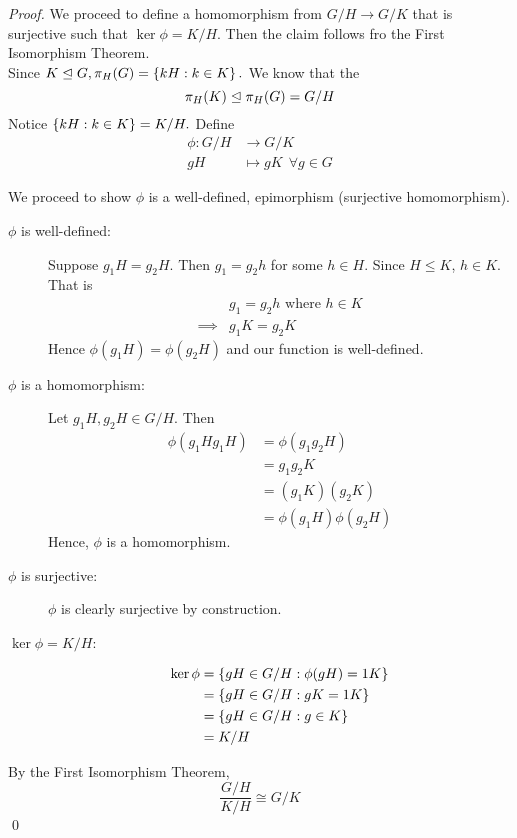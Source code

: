\begin{proof}
    We proceed to define a homomorphism from $G/H \to G/K$ that is surjective such that $\ker\phi = K/H$. Then the claim follows fro the First Isomorphism Theorem. \\

    Since $K\trianglelefteq G, \pi_H(G) = \left\{kH : k \in K\right\}.$ We know that the 
    $$\pi_H(K) \trianglelefteq \pi_H(G) = G/H$$
    Notice $\left\{kH : k \in K\right\} = K/H.$ Define 
    \begin{align*}
        \phi: G/H &\to G/K \\
        gH &\mapsto gK ~~\forall g \in G
    \end{align*}

    We proceed to show $\phi$ is a well-defined, epimorphism (surjective homomorphism).

    \begin{description}
        \item[$\phi$ is well-defined: ] Suppose $g_1H = g_2H$. Then $g_1 = g_2 h$ for some $h \in H.$ Since $H \leq K$, $h \in K.$ That is 
        \begin{align*}
            &g_1 = g_2h \text{ where } h \in K \\
            \implies &g_1K = g_2K
        \end{align*}
        Hence $\phi(g_1H) = \phi(g_2H)$ and our function is well-defined.

        \item[$\phi$ is a homomorphism: ] Let $g_1H, g_2H \in G/H$. Then 
        \begin{align*}
            \phi(g_1Hg_1H) &= \phi(g_1g_2H) \\
            &= g_1g_2K \\
            &= (g_1K)(g_2K) \\
            &= \phi(g_1H)\phi(g_2H)
        \end{align*}
        Hence, $\phi$ is a homomorphism.

        \item[$\phi$ is surjective: ] $\phi$ is clearly surjective by construction. 

        \item[$\ker\phi = K/H$: ]
        \begin{align*}
            \ker\phi &= \left\{gH \in G/H : \phi(gH) = 1K\right\} \\
            &= \left\{gH \in G/H : gK = 1K\right\} \\ 
            &= \left\{gH \in G/H : g \in K\right\} \\
            &= K/H
        \end{align*} 
    \end{description}
    By the First Isomorphism Theorem, 
    $$\frac{G/H}{K/H} \cong G/K$$
    \qed
\end{proof}

